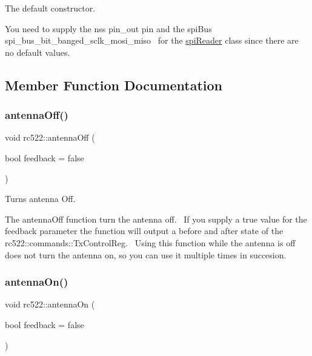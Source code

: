 The default constructor. 

You need to supply the nss pin\+\_\+out pin and the spi\+Bus spi\+\_\+bus\+\_\+bit\+\_\+banged\+\_\+sclk\+\_\+mosi\+\_\+miso~\newline
for the \hyperlink{classspiReader}{spi\+Reader} class since there are no default values. 

\subsection{Member Function Documentation}
\mbox{\label{classrc522_a3318612b0a93b415415ef9e1a6b03dae}} 
\subsubsection{\texorpdfstring{antenna\+Off()}{antennaOff()}}
{\footnotesize\ttfamily void rc522\+::antenna\+Off (\begin{DoxyParamCaption}\item[{bool}]{feedback = {\ttfamily false} }\end{DoxyParamCaption})}



Turns antenna Off. 

The antenna\+Off function turn the antenna off.~\newline
If you supply a true value for the feedback parameter the function will output a before and after state of the rc522\+::commands\+::\+Tx\+Control\+Reg.~\newline
Using this function while the antenna is off does not turn the antenna on, so you can use it multiple times in succesion. \mbox{\label{classrc522_a9f2477eaf7d1f2f3123714cce6311d62}} 
\subsubsection{\texorpdfstring{antenna\+On()}{antennaOn()}}
{\footnotesize\ttfamily void rc522\+::antenna\+On (\begin{DoxyParamCaption}\item[{bool}]{feedback = {\ttfamily false} }\end{DoxyParamCaption})}



